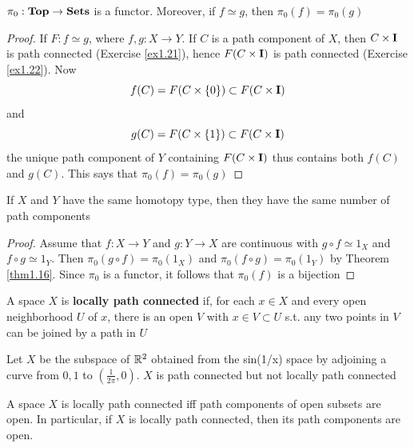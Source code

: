 \documentclass[11pt]{article}
\begin{document}
\begin{theorem}[]
\label{thm1.16}
\(\pi_0:\operatorname{\textbf{Top}}\to\operatorname{\textbf{Sets}}\) is a functor. Moreover, if \(f\simeq g\), then \(\pi_0(f)=\pi_0(g)\)
\end{theorem}

\begin{proof}
If \(F:f\simeq g\), where \(f,g:X\to Y\). If \(C\) is a path component of \(X\), then \(C\times\operatorname{\textbf{I}}\) is path
connected (Exercise \ref{ex1.21}), hence \(F(C\times\operatorname{\textbf{I}})\) is path connected (Exercise \ref{ex1.22}). Now
\begin{equation*}
f(C)=F(C\times\{0\})\subset F(C\times\operatorname{\textbf{I}})
\end{equation*}
and
\begin{equation*}
g(C)=F(C\times\{1\})\subset F(C\times\operatorname{\textbf{I}})
\end{equation*}
the unique path component of \(Y\) containing \(F(C\times\operatorname{\textbf{I}})\) thus contains both \(f(C)\)
and \(g(C)\). This says that \(\pi_0(f)=\pi_0(g)\)
\end{proof}

\begin{corollary}[]
If \(X\) and \(Y\) have the same homotopy type, then they have the same number of path components
\end{corollary}

\begin{proof}
Assume that \(f:X\to Y\) and \(g:Y\to X\) are continuous with \(g\circ f\simeq 1_X\) and \(f\circ g\simeq 1_Y\). Then
\(\pi_0(g\circ f)=\pi_0(1_X)\) and \(\pi_0(f\circ g)=\pi_0(1_Y)\) by Theorem \ref{thm1.16}. Since \(\pi_0\) is a
functor, it follows that \(\pi_0(f)\) is a bijection
\end{proof}


\begin{definition}[]
A space \(X\) is \textbf{locally path connected} if, for each \(x\in X\) and every open neighborhood \(U\)
of \(x\), there is an open \(V\) with \(x\in V\subset U\) s.t. any two points in \(V\) can be joined by a
path in \(U\)
\end{definition}

\begin{examplle}[]
Let \(X\) be the subspace of \(\mathbb{R}^2\) obtained from the sin(1/x) space by adjoining a curve
from \(0,1\) to \((\frac{1}{2\pi},0)\). \(X\) is path connected but not locally path connected
\end{examplle}

\begin{theorem}[]
\label{thm1.18}
A space \(X\) is locally path connected iff path components of open subsets are open. In
particular, if \(X\) is locally path connected, then its path components are open.
\end{theorem}
\end{document}
